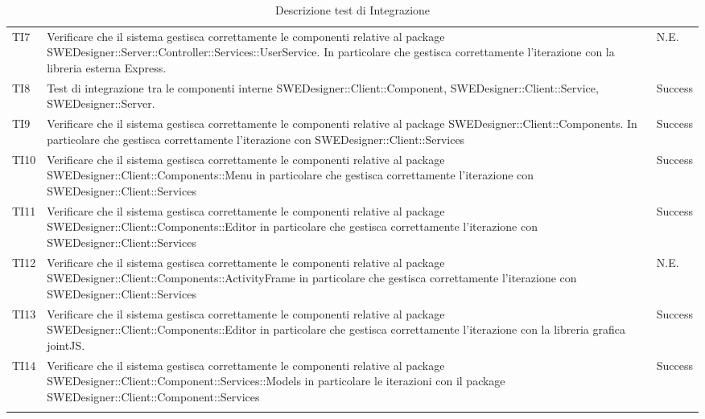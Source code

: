 \begin{longtable}{p{2cm}!{\VRule[1pt]}p{10cm}!{\VRule[1pt]}p{1cm}}
TI7 & Verificare che il sistema gestisca correttamente le componenti relative al package SWEDesigner::Server::Controller::Services::UserService. In particolare che gestisca correttamente l'iterazione con la libreria esterna Express. & N.E.\\

TI8 & Test di integrazione tra le componenti interne SWEDesigner::Client::Component, SWEDesigner::Client::Service, SWEDesigner::Server. & Success\\

TI9 & Verificare che il sistema gestisca correttamente le componenti relative al package SWEDesigner::Client::Components. In particolare che gestisca correttamente l’iterazione con SWEDesigner::Client::Services & Success\\

TI10 & Verificare che il sistema gestisca correttamente le componenti relative al package SWEDesigner::Client::Components::Menu in particolare che gestisca correttamente l'iterazione con SWEDesigner::Client::Services & Success\\

TI11 & Verificare che il sistema gestisca correttamente le componenti relative al package SWEDesigner::Client::Components::Editor in particolare che gestisca correttamente l'iterazione con SWEDesigner::Client::Services & Success\\

TI12 & Verificare che il sistema gestisca correttamente le componenti relative al package SWEDesigner::Client::Components::ActivityFrame in particolare che gestisca correttamente l'iterazione con SWEDesigner::Client::Services & N.E.\\

TI13 & Verificare che il sistema gestisca correttamente le componenti relative al package SWEDesigner::Client::Components::Editor in particolare che gestisca correttamente l'iterazione con la libreria grafica jointJS. & Success\\

TI14 & Verificare che il sistema gestisca correttamente le componenti relative al package SWEDesigner::Client::Component::Services::Models in particolare le iterazioni con il  package SWEDesigner::Client::Component::Services & Success\\

\caption{Descrizione test di Integrazione}
\end{longtable}


